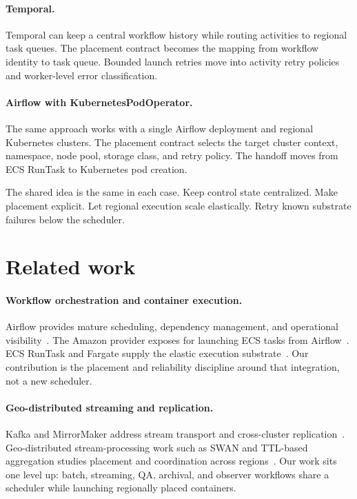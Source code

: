 \documentclass[11pt, reqno]{amsart}
\newcommand{\code}[1]{\texttt{\detokenize{#1}}}
\begin{document}
\paragraph{Temporal.}
Temporal can keep a central workflow history while routing activities to regional task queues. The placement contract becomes the mapping from workflow identity to task queue. Bounded launch retries move into activity retry policies and worker-level error classification.

\paragraph{Airflow with KubernetesPodOperator.}
The same approach works with a single Airflow deployment and regional Kubernetes clusters. The placement contract selects the target cluster context, namespace, node pool, storage class, and retry policy. The handoff moves from ECS RunTask to Kubernetes pod creation.

The shared idea is the same in each case. Keep control state centralized. Make placement explicit. Let regional execution scale elastically. Retry known substrate failures below the scheduler.

\section{Related work}
\label{sec:related}

\paragraph{Workflow orchestration and container execution.}
Airflow provides mature scheduling, dependency management, and operational visibility~\cite{airflow_docs}. The Amazon provider exposes \code{EcsRunTaskOperator} for launching ECS tasks from Airflow~\cite{airflow_ecs_operator,airflow_amazon_exceptions}. ECS RunTask and Fargate supply the elastic execution substrate~\cite{aws_ecs_runtask,aws_fargate_networking}. Our contribution is the placement and reliability discipline around that integration, not a new scheduler.

\paragraph{Geo-distributed streaming and replication.}
Kafka and MirrorMaker address stream transport and cross-cluster replication~\cite{kafka_docs,kafka_geo_replication_mm2,kafka_mm2_configs}. Geo-distributed stream-processing work such as SWAN and TTL-based aggregation studies placement and coordination across regions~\cite{swan_apsys22,ttl_geo_streaming_2019}. Our work sits one level up: batch, streaming, QA, archival, and observer workflows share a scheduler while launching regionally placed containers.
\end{document}
